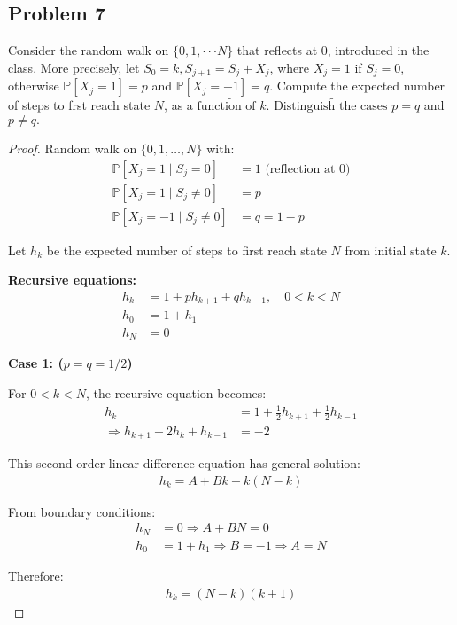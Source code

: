 \documentclass[letterpaper, 11pt]{article}
\newcommand{\1}{\mathds{1}}	%
\theoremstyle{definition}
\begin{document}
\subsection*{Problem 7}
Consider the random walk on $\{0,1,\cdotp\cdotp\cdotp N\}$ that reflects at 0, introduced in the class. More precisely, let $S_0=k,S_{j+1}=S_j+X_j$, where $X_j=1$ if $S_j=0$, otherwise $\mathbb{P}[X_j=1]=p$ and $\mathbb{P}[X_j=-1]=q.$ Compute the expected number of steps to frst reach state $N$, as a $\tilde{\text{function of }k}.\tilde{\text{ Distinguish the cases }p}=q$ and $p\neq q.$
\begin{proof}
    Random walk on $\{0,1,\ldots,N\}$ with:
\begin{align*}
\mathbb{P}[X_j = 1 \mid S_j = 0] &= 1 \text{ (reflection at 0)}\\
\mathbb{P}[X_j = 1 \mid S_j \neq 0] &= p\\
\mathbb{P}[X_j = -1 \mid S_j \neq 0] &= q = 1-p
\end{align*}

Let $h_k$ be the expected number of steps to first reach state $N$ from initial state $k$.

\textbf{Recursive equations:}
\begin{align*}
h_k &= 1 + ph_{k+1} + qh_{k-1}, \quad 0 < k < N\\
h_0 &= 1 + h_1\\
h_N &= 0
\end{align*}

\textbf{Case 1:  ($p = q = 1/2$)}

For $0 < k < N$, the recursive equation becomes:
\begin{align*}
h_k &= 1 + \frac{1}{2}h_{k+1} + \frac{1}{2}h_{k-1}\\
\Rightarrow h_{k+1} - 2h_k + h_{k-1} &= -2
\end{align*}

This second-order linear difference equation has general solution:
\begin{align*}
h_k = A + Bk + k(N-k)
\end{align*}

From boundary conditions:
\begin{align*}
h_N &= 0 \Rightarrow A + BN = 0\\
h_0 &= 1 + h_1 \Rightarrow B = -1 \Rightarrow A = N
\end{align*}

Therefore:
\begin{align*}
h_k = (N-k)(k+1)
\end{align*}


\end{proof}
\end{document}
